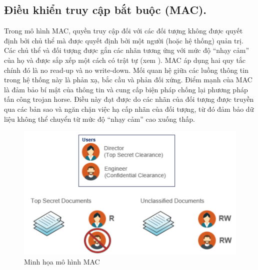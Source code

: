 \subsection{Điều khiển truy cập bắt buộc (MAC).}

Trong mô hình MAC, quyền truy cập đối với các đối tượng không được quyết
định bởi chủ thể mà được quyết định bởi một người (hoặc hệ thống) quản trị. Các chủ
thể và đối tượng được gắn các nhãn tương ứng với mức độ “nhạy cảm” của họ và được
sắp xếp một cách có trật tự (xem ). MAC áp dụng hai quy tắc chính đó là
no read-up và no write-down. Mối quan hệ giữa các luồng thông tin trong hệ thống này
là phản xạ, bắc cầu và phản đối xứng. Điểm mạnh của MAC là đảm bảo bí mật của thông
tin và cung cấp biện pháp chống lại phương pháp tấn công trojan horse. Điều này đạt
được do các nhãn của đối tượng được truyền qua các bản sao và ngăn chặn việc hạ cấp
nhãn của đối tượng, từ đó đảm bảo dữ liệu không thể chuyển từ mức độ “nhạy cảm” cao
xuống thấp. \\
\begin{figure}
    \centering
    \includegraphics[scale=0.5]{graphics/chapter-2/chap2-mac.png}
    \caption{Minh họa mô hình MAC}
    \label{fig:chap2-mac}
\end{figure}

